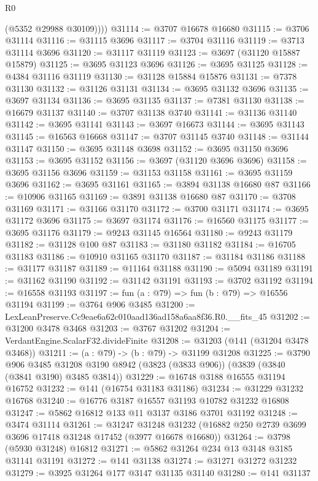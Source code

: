 \begin{lexlean}{R0}
\begin{coremodule}
          (@5352 @29988 @30109))))
@31114 := @3707 @16678 @16680
@31115 := @3706 @31114
@31116 := @31115 @3696
@31117 := @3704 @31116
@31119 := @3713 @31114 @3696
@31120 := @31117 @31119
@31123 := @3697 (@31120 @15887 @15879)
@31125 := @3695 @31123 @3696
@31126 := @3695 @31125
@31128 := @4384 @31116 @31119
@31130 := @31128 @15884 @15876
@31131 := @7378 @31130
@31132 := @31126 @31131
@31134 := @3695 @31132 @3696
@31135 := @3697 @31134
@31136 := @3695 @31135
@31137 := @7381 @31130
@31138 := @16679 @31137
@31140 := @3707 @31138 @3740
@31141 := @31136 @31140
@31142 := @3695 @31141
@31143 := @3697 @16673
@31144 := @3695 @31143
@31145 := @16563 @16668
@31147 := @3707 @31145 @3740
@31148 := @31144 @31147
@31150 := @3695 @31148 @3698
@31152 := @3695 @31150 @3696
@31153 := @3695 @31152
@31156 := @3697 (@31120 @3696 @3696)
@31158 := @3695 @31156 @3696
@31159 := @31153 @31158
@31161 := @3695 @31159 @3696
@31162 := @3695 @31161
@31165 := @3894 @31138 @16680 @87
@31166 := @10906 @31165
@31169 := @3891 @31138 @16680 @87
@31170 := @3708 @31169
@31171 := @31166 @31170
@31172 := @3700 @31171
@31174 := @3695 @31172 @3696
@31175 := @3697 @31174
@31176 := @16560 @31175
@31177 := @3695 @31176
@31179 := @9243 @31145 @16564
@31180 := @9243 @31179
@31182 := @31128 @100 @87
@31183 := @31180 @31182
@31184 := @16705 @31183
@31186 := @10910 @31165 @31170
@31187 := @31184 @31186
@31188 := @31177 @31187
@31189 := @11164 @31188
@31190 := @5094 @31189
@31191 := @31162 @31190
@31192 := @31142 @31191
@31193 := @3702 @31192
@31194 := @16558 @31193
@31197 := fun (a : @79) => fun (b : @79) => @16556 @31194
@31199 := @3764 @906 @3485
@31200 := LexLeanPreserve.Cc9eae6a62c010aad136ad158a6aa8f36.R0.__fits_45
@31202 := @31200 @3478 @3468
@31203 := @3767 @31202
@31204 := VerdantEngine.ScalarF32.divideFinite
@31208 := @31203 (@141 (@31204 @3478 @3468))
@31211 := (a : @79) -> (b : @79) -> @31199 @31208
@31225 := @3790
    @906
    @3485
    @31208
    @3190
    @8942
    (@3823 (@3833 @906))
    (@3839 (@3840 (@3841 @3190) @3485 @3814))
@31229 := @16748 @3188 @16555 @31194 @16752
@31232 := @141 (@16754 @31183 @31186)
@31234 := @31229 @31232 @16768
@31240 := @16776 @3187 @16557 @31193 @10782 @31232 @16808
@31247 := @5862 @16812 @133 @11 @3137 @3186 @3701 @31192
@31248 := @3474 @31114
@31261 := @31247
    @31248
    @31232
    (@16882 @250 @2739 @3699 @3696 @17418 @31248 @17452 (@3977 @16678 @16680))
@31264 := @3798 (@5930 @31248) @16812
@31271 := @5862 @31264 @234 @13 @3148 @3185 @31141 @31191
@31272 := @141 @31138
@31274 := @31271 @31272 @31232
@31279 := @3925 @31264 @177 @3147 @31135 @31140
@31280 := @141 @31137

\end{coremodule}
\end{lexlean}
